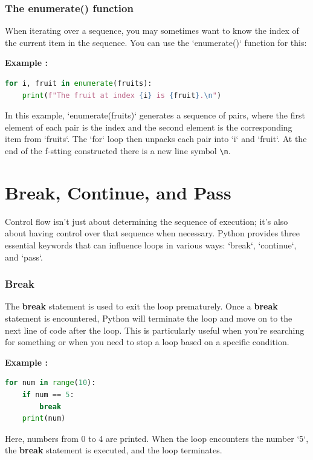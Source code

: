 \documentclass[12pt]{book}
\newtheorem{Example}{Example}[chapter]
\renewenvironment{Example}{\begin{trivlist}\item\relax
\textbf{Example \thesection: }}{\end{trivlist}}
\begin{document}
\subsubsection{The enumerate() function}
When iterating over a sequence, you may sometimes want to know the index of the current item in the sequence. You can use the `enumerate()` function for this:
\begin{Example}
\begin{lstlisting}[language=Python]
for i, fruit in enumerate(fruits):
    print(f"The fruit at index {i} is {fruit}.\n")
\end{lstlisting}
\end{Example}
In this example, `enumerate(fruits)` generates a sequence of pairs, where the first element of each pair is the index and the second element is the corresponding item from `fruits`. The `for` loop then unpacks each pair into `i` and `fruit`. At the end of the f-stting constructed there is a new line symbol  \texttt{\textbackslash n}.


\section{Break, Continue, and Pass}

Control flow isn't just about determining the sequence of execution; it's also about having control over that sequence when necessary. Python provides three essential keywords that can influence loops in various ways: `break`, `continue`, and `pass`.

\subsubsection{Break}
The \textbf{break} statement is used to exit the loop prematurely. Once a \textbf{break} statement is encountered, Python will terminate the loop and move on to the next line of code after the loop. This is particularly useful when you're searching for something or when you need to stop a loop based on a specific condition.

\begin{Example}
\begin{lstlisting}[language=Python]
for num in range(10):
    if num == 5:
        break
    print(num)
\end{lstlisting}
\end{Example}
Here, numbers from 0 to 4 are printed. When the loop encounters the number `5`, the \textbf{break} statement is executed, and the loop terminates.
\end{document}
